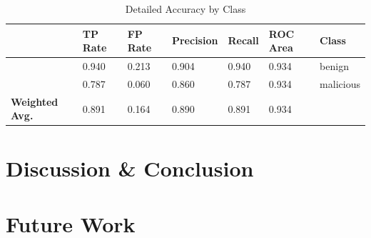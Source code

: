 \small
\begin{table}[]
\centering
\begin{tabular}{|l|l|l|l|l|l|l|}
\hline
                       & \textbf{TP Rate} & \textbf{FP Rate} & \textbf{Precision} & \textbf{Recall} & \textbf{ROC Area} & \textbf{Class} \\ \hline
                       & 0.940            & 0.213            & 0.904              & 0.940           & 0.934             & benign         \\ \hline
                       & 0.787            & 0.060            & 0.860              & 0.787           & 0.934             & malicious      \\ \hline
\textbf{Weighted Avg.} & 0.891            & 0.164            & 0.890              & 0.891           & 0.934             &                \\ \hline
\end{tabular}
\caption{Detailed Accuracy by Class} \label{detailAcc}
\end{table}
\normalsize

\section{Discussion \& Conclusion}

\section{Future Work}